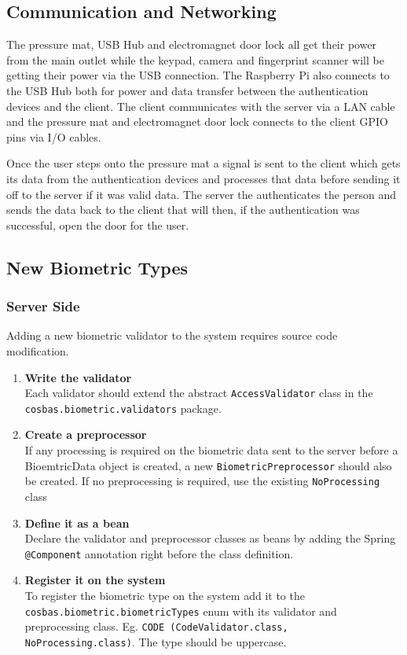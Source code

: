 \subsection{Communication and Networking}
The pressure mat, USB Hub and electromagnet door lock all get their power from the main outlet while the keypad, camera and fingerprint scanner will be getting their power via the USB connection. The Raspberry Pi also connects to the USB Hub both for power and data transfer between the authentication devices and the client. The client communicates with the server via a LAN cable and the pressure mat and electromagnet door lock connects to the client GPIO pins via I/O cables. 

Once the user steps onto the pressure mat a signal is sent to the client which gets its data from the authentication devices and processes that data before sending it off to the server if it was valid data. The server the authenticates the person and sends the data back to the client that will then, if the authentication was successful, open the door for the user.

\subsection{New Biometric Types}

\subsubsection{Server Side}
Adding a new biometric validator to the system requires source code modification. 
\begin{enumerate}
	\item \textbf{Write the validator} \\
	Each validator should extend the abstract \verb!AccessValidator! class in the \verb!cosbas.biometric.validators! package.	
	\item \textbf{Create a preprocessor} \\ If any processing is required on the biometric data sent to the server before a BioemtricData object is created, a new \verb!BiometricPreprocessor! should also be created. If no preprocessing is required, use the existing \verb!NoProcessing! class
	\item \textbf{Define it as a bean} \\ 
	Declare the validator and preprocessor classes as beans by adding the Spring  \verb!@Component! annotation right before the class definition.
	\item \textbf{Register it on the system} \\
	To register the biometric type on the system add it to the \verb!cosbas.biometric.biometricTypes! enum with its validator and preprocessing class. Eg. 
	\verb!CODE (CodeValidator.class, NoProcessing.class)!. The type should be uppercase.
	
\end{enumerate}

